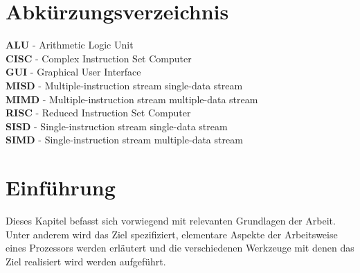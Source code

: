 \documentclass[12pt]{article}
\begin{document}
\newpage

\thispagestyle{empty}
\tableofcontents

\newpage

\thispagestyle{plain}
\cleardoublepage
{}
\listoffigures

\listoftables

\lstlistoflistings

\newpage

\thispagestyle{plain}
\cleardoublepage
\section*{Abkürzungsverzeichnis}
\textbf{ALU} - Arithmetic Logic Unit\\
\textbf{CISC} - Complex Instruction Set Computer\\
\textbf{GUI} - Graphical User Interface\\
\textbf{MISD} - Multiple-instruction stream single-data stream\\
\textbf{MIMD} - Multiple-instruction stream multiple-data stream\\
\textbf{RISC} - Reduced Instruction Set Computer\\
\textbf{SISD} - Single-instruction stream single-data stream\\
\textbf{SIMD} - Single-instruction stream multiple-data stream

\newpage
{}

\pagestyle{scrheadings} %

\clearpairofpagestyles
\clearmainofpairofpagestyles

\ihead[]{\leftmark} %

\cfoot[\pagemark]{\pagemark} %



\section{Einführung}
Dieses Kapitel befasst sich vorwiegend mit relevanten Grundlagen der Arbeit. Unter anderem wird das Ziel spezifiziert, elementare Aspekte der Arbeitsweise eines Prozessors werden erläutert und die verschiedenen Werkzeuge mit denen das Ziel realisiert wird werden aufgeführt.
\end{document}
